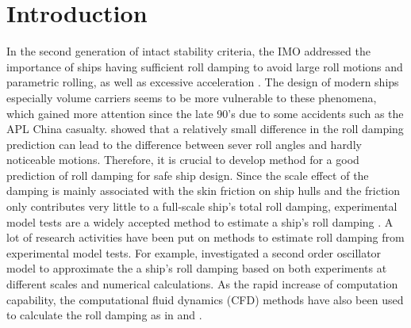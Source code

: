 \section{Introduction}
\label{se:introduction}

In the second generation of intact stability criteria, the IMO addressed the importance of ships having sufficient roll damping to avoid large roll motions and parametric rolling, as well as excessive acceleration \parencite{imo_finalization_2016}.
The design of modern ships especially volume carriers seems to be more vulnerable to these phenomena, which gained more attention since the late 90’s due to some accidents such as the APL China casualty.
\parencite{soder_ikeda_2019} showed that a relatively small difference in the roll damping prediction can lead to the difference between sever roll angles and hardly noticeable motions. Therefore, it is crucial to develop method for a good prediction of roll damping for safe ship design.
Since the scale effect of the damping is mainly associated with the skin friction on ship hulls and the friction only contributes very little to a full-scale ship's total roll damping, experimental model tests are a widely accepted method to estimate a ship's roll damping \parencite{imo_1200_2006}. A lot of research activities have been put on methods to estimate roll damping from experimental model tests. For example, \parencite[]{hua_approximation_2011} investigated a second order oscillator model to approximate the a ship's roll damping based on both experiments at different scales and numerical calculations.
As the rapid increase of computation capability, the computational fluid dynamics (CFD) methods have also been used to calculate the roll damping as in \parencite{kristiansen_experimental_2014} and \parencite{henry_peter_piehl_ship_2016}.  

